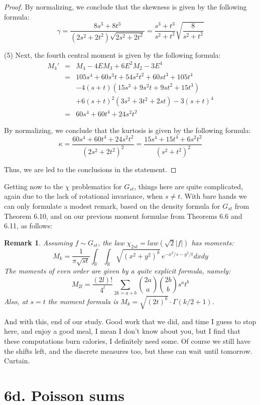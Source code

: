 \documentclass[12pt]{amsbook}
\newtheorem{remark}[theorem]{Remark}
\begin{document}
\begin{proof}
By normalizing, we conclude that the skewness is given by the following formula:
$$\gamma=\frac{8s^3+8t^3}{(2s^2+2t^2)\sqrt{2s^2+2t^2}}
=\frac{s^3+t^3}{s^2+t^2}\sqrt{\frac{8}{s^2+t^2}}$$

(5) Next, the fourth central moment is given by the following formula:
\begin{eqnarray*}
M_4'
&=&M_4-4EM_3+6E^2M_2-3E^4\\
&=&105s^4+60s^3t+54s^2t^2+60st^3+105t^4\\
&&-4(s+t)(15s^3+9s^2t+9st^2+15t^3)\\
&&+6(s+t)^2(3s^2+3t^2+2st)-3(s+t)^4\\
&=&60s^4+60t^4+24s^2t^2
\end{eqnarray*} 

By normalizing, we conclude that the kurtosis is given by the following formula:
$$\kappa=\frac{60s^4+60t^4+24s^2t^2}{(2s^2+2t^2)^2}=\frac{15s^4+15t^4+6s^2t^2}{(s^2+t^2)^2}$$

Thus, we are led to the conclusions in the statement.
\end{proof}

Getting now to the $\chi$ problematics for $G_{st}$, things here are quite complicated, again due to the lack of rotational invariance, when $s\neq t$. With bare hands we can only formulate a modest remark, based on the density formula for $G_{st}$ from Theorem 6.10, and on our previous moment formulae from Theorems 6.6 and 6.11, as follows:

\begin{remark}
Assuming $f\sim G_{st}$, the law $\chi_{2st}=law(\sqrt{2}|f|)$ has moments:
$$M_k=\frac{1}{\pi\sqrt{st}}\int_\mathbb R\int_\mathbb R\sqrt{(x^2+y^2)^k}\,e^{-x^2/s-y^2/t}dxdy$$
The moments of even order are given by a quite explicit formula, namely:
$$M_{2l}=\frac{(2l)!}{4^l}\sum_{2k=a+b}\binom{2a}{a}\binom{2b}{b}s^at^b$$
Also, at $s=t$ the moment formula is $M_k=\sqrt{(2t)^k}\cdot\Gamma(k/2+1)$.
\end{remark}

And with this, end of our study. Good work that we did, and time I guess to stop here, and enjoy a good meal, I mean I don't know about you, but I find that these computations burn calories, I definitely need some. Of course we still have the shifts left, and the discrete measures too, but these can wait until tomorrow. Curtain.

\section*{6d. Poisson sums}
\end{document}
